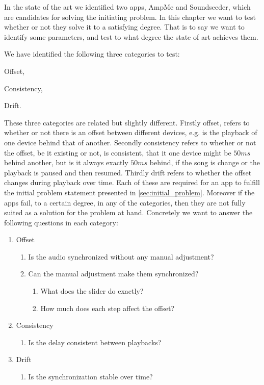 In the state of the art we identified two apps, AmpMe and Soundseeder, which are candidates for solving the initiating problem. 
In this chapter we want to test whether or not they solve it to a satisfying degree. 
That is to say we want to identify some parameters, and test to what degree the state of art achieves them.

We have identified the following three categories to test:
\begin{enumerate*}[label=(\alph*)]
    \item Offset,
    \item Consistency,
    \item Drift.
\end{enumerate*}

These three categories are related but slightly different. 
Firstly offset, refers to whether or not there is an offset between different devices, e.g. is the playback of one device behind that of another.
Secondly consistency refers to whether or not the offset, be it existing or not, is consistent, that it one device might be $50 ms$ behind another, but is it always exactly $50 ms$ behind, if the song is change or the playback is paused and then resumed.
Thirdly drift refers to whether the offset changes during playback over time.
Each of these are required for an app to fulfill the initial problem statement presented in \vref{sec:initial_problem}.
Moreover if the apps fail, to a certain degree, in any of the categories, then they are not fully suited as a solution for the problem at hand. 
Concretely we want to answer the following questions in each category:
\begin{enumerate}[label=(\alph*)]
    \item Offset
    \begin{enumerate}[label=(\arabic*)]
        \item Is the audio synchronized without any manual adjustment?
        \item Can the manual adjustment make them synchronized?
        \begin{enumerate}
            \item What does the slider do exactly?
            \item How much does each step affect the offset?
        \end{enumerate}
    \end{enumerate} 
    \item Consistency
    \begin{enumerate}[start=3,label=(\arabic*)]
        \item Is the delay consistent between playbacks?
    \end{enumerate}
    \item Drift
    \begin{enumerate}[start=6,label=(\arabic*)]
        \item Is the synchronization stable over time?
    \end{enumerate}
\end{enumerate}

